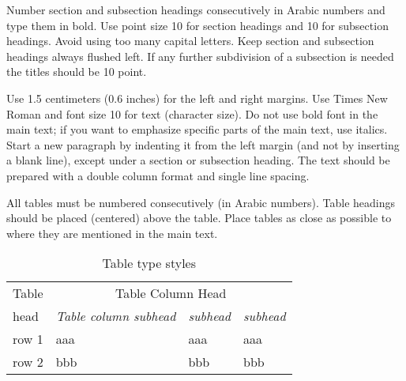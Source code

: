 \documentclass[a4paper, times, 10pt,twocolumn]{article}
\begin{document}

Number section and subsection headings consecutively in Arabic numbers and type them in bold. Use point size 10 for section headings and 10 for subsection headings. Avoid using too many capital letters. Keep section and subsection headings always flushed left. If any further subdivision of a subsection is needed the titles should be 10 point.


Use 1.5 centimeters (0.6 inches) for the left and right margins. Use Times New Roman and font size 10 for text (character size). Do not use bold font in the main text; if you want to emphasize specific parts of the main text, use italics. Start a new paragraph by indenting it from the left margin (and not by inserting a blank line), except under a section or subsection heading. The text should be prepared with a double column format and single line spacing.


All tables must be numbered consecutively (in Arabic numbers). Table headings should be placed (centered) above the table. Place tables as close as possible to where they are mentioned in the main text.
\begin{table}[h]
\footnotesize
\centering
\caption{Table type styles}
\begin{tabular}{p{1cm}p{3cm}p{1.5cm}p{1.5cm}}
\hline
Table &\multicolumn{3}{c}{Table Column Head}\\ \cline{2-4}
head & \emph{Table column subhead} & \emph{subhead} & \emph{subhead}\\ \hline
row 1 & aaa & aaa & aaa \\
row 2 & bbb & bbb & bbb \\
\hline
\end{tabular}
\end{table}

\end{document}

